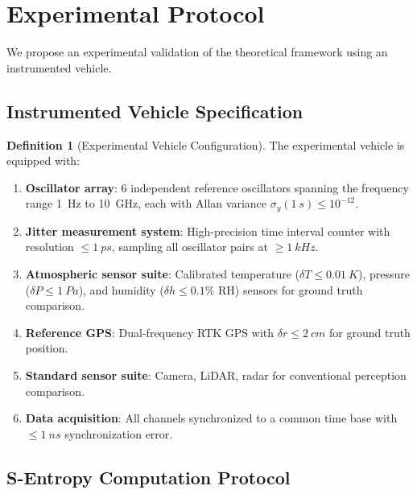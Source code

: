 \documentclass[twocolumn,10pt]{article}
\theoremstyle{definition}
\newtheorem{definition}[theorem]{Definition}
\theoremstyle{remark}
\begin{document}
\section{Experimental Protocol}\label{sec:experiment}

We propose an experimental validation of the theoretical framework using an
instrumented vehicle.

\subsection{Instrumented Vehicle Specification}

\begin{definition}[Experimental Vehicle Configuration]\label{def:exp-vehicle}
The experimental vehicle is equipped with:
\begin{enumerate}[label=(\roman*)]
  \item \textbf{Oscillator array}: 6 independent reference oscillators
    spanning the frequency range \SI{1}{Hz} to \SI{10}{GHz}, each with
    Allan variance $\sigma_y(\SI{1}{s}) \leq 10^{-12}$.
  \item \textbf{Jitter measurement system}: High-precision time interval
    counter with resolution $\leq \SI{1}{ps}$, sampling all oscillator
    pairs at $\geq \SI{1}{kHz}$.
  \item \textbf{Atmospheric sensor suite}: Calibrated temperature
    ($\delta T \leq \SI{0.01}{K}$), pressure ($\delta P \leq \SI{1}{Pa}$),
    and humidity ($\delta h \leq 0.1\%$ RH) sensors for ground truth
    comparison.
  \item \textbf{Reference GPS}: Dual-frequency RTK GPS with
    $\delta r \leq \SI{2}{cm}$ for ground truth position.
  \item \textbf{Standard sensor suite}: Camera, LiDAR, radar for
    conventional perception comparison.
  \item \textbf{Data acquisition}: All channels synchronized to a common
    time base with $\leq \SI{1}{ns}$ synchronization error.
\end{enumerate}
\end{definition}

\subsection{S-Entropy Computation Protocol}
\end{document}
